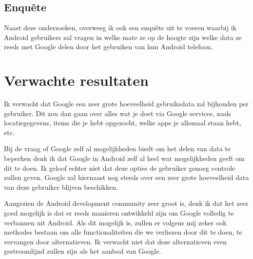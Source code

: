 \vspace{2mm}

\subsection{{Enquête}}



Naast deze onderzoeken, overweeg ik ook een enquête uit te voeren waarbij ik Android gebruikers zal vragen in welke mate ze op de hoogte zijn welke data ze reeds met Google delen door het gebruiken van hun Android telefoon.

\section{Verwachte resultaten}
\label{sec:verwachte_resultaten}

Ik verwacht dat Google een zeer grote hoeveelheid gebruiksdata zal bijhouden per gebruiker. Dit zou dan gaan over alles wat je doet via Google services, zoals locatiegegevens, items die je hebt opgezocht, welke apps je allemaal staan hebt, etc.

\vspace{2mm}

Bij de vraag of Google zelf al mogelijkheden biedt om het delen van data te beperken denk ik dat Google in Android zelf al heel wat mogelijkheden geeft om dit te doen. Ik geloof echter niet dat deze opties de gebruiker genoeg controle zullen geven. Google zal hiernaast nog steeds over een zeer grote hoeveelheid data van deze gebruiker blijven beschikken.

\vspace{2mm}

Aangezien de Android development community zeer groot is, denk ik dat het zeer goed mogelijk is dat er reeds manieren ontwikkeld zijn om Google volledig te verbannen uit Android. Als dit mogelijk is, zullen er volgens mij zeker ook methodes bestaan om alle functionaliteiten die we verliezen door dit te doen, te vervangen door alternatieven. Ik verwacht niet dat deze alternatieven even gestroomlijnd zullen zijn als het aanbod van Google. 

